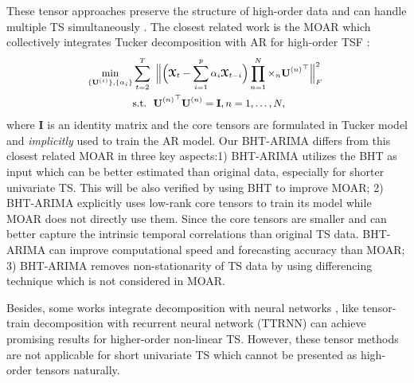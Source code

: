 \documentclass[letterpaper]{article} %
\numberwithin{theorem}{section}
\newcommand{\ten}[1]{ \boldsymbol{\mathcal #1}}
\begin{document}
These tensor  approaches preserve the structure of high-order data and can handle multiple TS simultaneously \cite{rogers2013multilinear,fanaee2016tensor,de2017tensorcast,bhanu2018forecasting,agarwal2018model}. The closest  related work is the  MOAR which collectively integrates    Tucker decomposition  with AR   for high-order TSF \cite{jing2018high}:
\begin{equation}\label{MOAR}
\small
\begin{aligned}
\hspace{-0.1cm} \mathop{\min}_{ \{{\mathbf U}^{(i)}\}, \{\alpha_i \}  } &  \sum_{t=2}^{{T}}\ \Big \| \Big(  {{\ten{X}}_t}  -  \sum_{i=1}^{p} \alpha_i  {{\ten{X}}_{t-i}}  \Big) \prod_{n=1}^N \times_n { \mathbf U}{^{(n)}}^\top   \Big {\|} _F^2   \\&  \text{s.t.}  \ \ { \mathbf U}{^{(n)}}^\top { \mathbf U}{^{(n)}} = \mathbf I, n=1,\ldots, N, 
\end{aligned}
\end{equation}
where   $\mathbf I$ is an identity matrix and  the core tensors  are formulated in Tucker model and   \textit{implicitly}  used  to train the  AR model.  Our BHT-ARIMA  differs  from this closest related MOAR in three key aspects:1) BHT-ARIMA utilizes the BHT as input which can be better estimated than original data, especially for shorter univariate TS.   This will be also  verified by using BHT to improve MOAR;
2) BHT-ARIMA explicitly  uses low-rank core tensors to train its model while  MOAR does not directly use them. Since the core tensors are  smaller and can  better capture the intrinsic temporal correlations than  original TS data. BHT-ARIMA can improve computational speed  and   forecasting accuracy than MOAR;    
3)  BHT-ARIMA removes non-stationarity  of TS data by using  differencing technique  which is not considered in MOAR.

Besides, some works  integrate  decomposition with neural networks \cite{chen2018neucast,ma2019large,sun2019bayesian}, like tensor-train decomposition  with recurrent neural network (TTRNN) \cite{yu2017long}   can  achieve promising results for higher-order non-linear TS.   However, these tensor methods are not applicable for  short  univariate TS which cannot be presented as high-order tensors naturally.  
\end{document}
